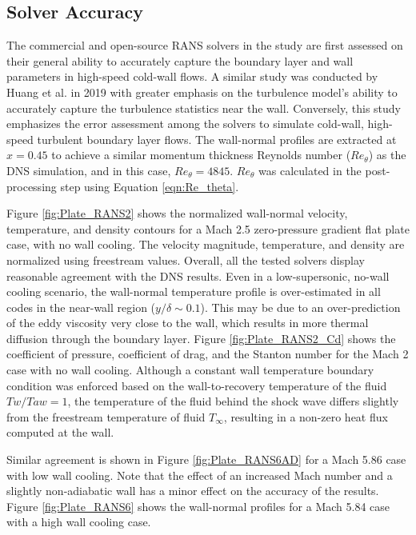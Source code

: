 \documentclass[journal ]{new-aiaa}
\begin{document}
\subsection{Solver Accuracy}
The commercial and open-source RANS solvers in the study are first assessed on their general ability to accurately capture the boundary layer and wall parameters in high-speed cold-wall flows. A similar study was conducted by Huang et al. \cite{Huang2019} in 2019 with greater emphasis on the turbulence model's ability to accurately capture the turbulence statistics near the wall. Conversely, this study emphasizes the error assessment among the solvers to simulate cold-wall, high-speed turbulent boundary layer flows.  %
The wall-normal profiles are extracted at $x = 0.45$ to achieve a similar momentum thickness Reynolds number ($Re_{\theta}$) as the DNS simulation, and in this case, $Re_{\theta} = 4845$. $Re_{\theta}$ was calculated in the post-processing step using Equation \eqref{eqn:Re_theta}.


Figure \ref{fig:Plate_RANS2} shows the normalized wall-normal velocity, temperature, and density contours for a Mach 2.5 zero-pressure gradient flat plate case, with no wall cooling. The velocity magnitude, temperature, and density are normalized using freestream values. %
Overall, all the tested solvers display reasonable agreement with the DNS results. Even in a low-supersonic, no-wall cooling scenario, the wall-normal temperature profile is over-estimated in all codes in the near-wall region ($y/\delta \sim 0.1$). This may be due to an over-prediction of the eddy viscosity very close to the wall, which results in more thermal diffusion through the boundary layer. Figure \ref{fig:Plate_RANS2_Cd} shows the coefficient of pressure, coefficient of drag, and the Stanton number for the Mach 2 case with no wall cooling. Although a constant wall temperature boundary condition was enforced based on the wall-to-recovery temperature of the fluid $Tw/Taw = 1$, the temperature of the fluid behind the shock wave differs slightly from the freestream temperature of fluid $T_{\infty}$, resulting in a non-zero heat flux computed at the wall. 

Similar agreement is shown in Figure \ref{fig:Plate_RANS6AD} for a Mach 5.86 case with low wall cooling. 
Note that the effect of an increased Mach number and a slightly non-adiabatic wall has a minor effect on the accuracy of the results. Figure \ref{fig:Plate_RANS6} shows the wall-normal profiles for a Mach 5.84 case with a high wall cooling case. 
\end{document}
